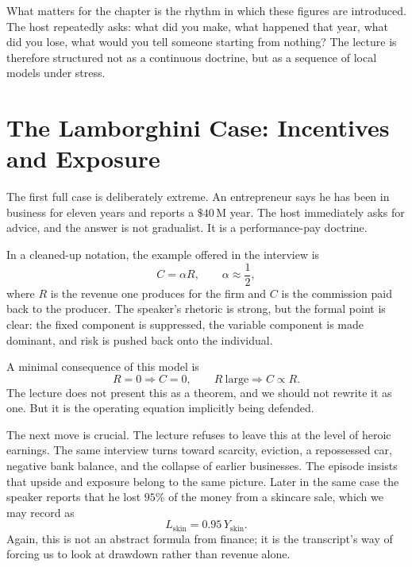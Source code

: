What matters for the chapter is the rhythm in which these figures are introduced. The host repeatedly asks: what did you make, what happened that year, what did you lose, what would you tell someone starting from nothing? The lecture is therefore structured not as a continuous doctrine, but as a sequence of local models under stress.

\section{The Lamborghini Case: Incentives and Exposure}

The first full case is deliberately extreme. An entrepreneur says he has been in business for eleven years and reports a \(\$40\,\mathrm{M}\) year. The host immediately asks for advice, and the answer is not gradualist. It is a performance-pay doctrine.

In a cleaned-up notation, the example offered in the interview is
\begin{equation}
C=\alpha R,\qquad \alpha \approx \frac12,
\end{equation}
where \(R\) is the revenue one produces for the firm and \(C\) is the commission paid back to the producer. The speaker's rhetoric is strong, but the formal point is clear: the fixed component is suppressed, the variable component is made dominant, and risk is pushed back onto the individual.

A minimal consequence of this model is
\begin{equation}
R=0 \Longrightarrow C=0,
\qquad
R\ \text{large} \Longrightarrow C\propto R.
\end{equation}
The lecture does not present this as a theorem, and we should not rewrite it as one. But it is the operating equation implicitly being defended.

The next move is crucial. The lecture refuses to leave this at the level of heroic earnings. The same interview turns toward scarcity, eviction, a repossessed car, negative bank balance, and the collapse of earlier businesses. The episode insists that upside and exposure belong to the same picture. Later in the same case the speaker reports that he lost \(95\%\) of the money from a skincare sale, which we may record as
\begin{equation}
L_{\mathrm{skin}}=0.95\,Y_{\mathrm{skin}}.
\end{equation}
Again, this is not an abstract formula from finance; it is the transcript's way of forcing us to look at drawdown rather than revenue alone.

